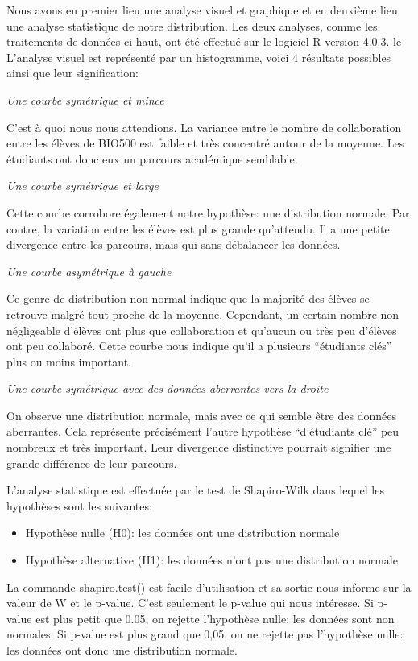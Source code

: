 \documentclass[9pt,twocolumn,twoside,]{pnas-new}
\providecommand{\tightlist}{%
  \setlength{\itemsep}{0pt}\setlength{\parskip}{0pt}}
\begin{document}
Nous avons en premier lieu une analyse visuel et graphique et en
deuxième lieu une analyse statistique de notre distribution. Les deux
analyses, comme les traitements de données ci-haut, ont été effectué sur
le logiciel R version 4.0.3. le L'analyse visuel est représenté par un
histogramme, voici 4 résultats possibles ainsi que leur signification:

\emph{Une courbe symétrique et mince}

C'est à quoi nous nous attendions. La variance entre le nombre de
collaboration entre les élèves de BIO500 est faible et très concentré
autour de la moyenne. Les étudiants ont donc eux un parcours académique
semblable.

\emph{Une courbe symétrique et large}

Cette courbe corrobore également notre hypothèse: une distribution
normale. Par contre, la variation entre les élèves est plus grande
qu'attendu. Il a une petite divergence entre les parcours, mais qui sans
débalancer les données.

\emph{Une courbe asymétrique à gauche}

Ce genre de distribution non normal indique que la majorité des élèves
se retrouve malgré tout proche de la moyenne. Cependant, un certain
nombre non négligeable d'élèves ont plus que collaboration et qu'aucun
ou très peu d'élèves ont peu collaboré. Cette courbe nous indique qu'il
a plusieurs ``étudiants clés'' plus ou moins important.

\emph{Une courbe symétrique avec des données aberrantes vers la droite}

On observe une distribution normale, mais avec ce qui semble être des
données aberrantes. Cela représente précisément l'autre hypothèse
``d'étudiants clé'' peu nombreux et très important. Leur divergence
distinctive pourrait signifier une grande différence de leur parcours.

L'analyse statistique est effectuée par le test de Shapiro-Wilk dans
lequel les hypothèses sont les suivantes:

\begin{itemize}
\tightlist
\item
  Hypothèse nulle (H0): les données ont une distribution normale
\item
  Hypothèse alternative (H1): les données n'ont pas une distribution
  normale
\end{itemize}

La commande shapiro.test() est facile d'utilisation et sa sortie nous
informe sur la valeur de W et le p-value. C'est seulement le p-value qui
nous intéresse. Si p-value est plus petit que 0.05, on rejette
l'hypothèse nulle: les données sont non normales. Si p-value est plus
grand que 0,05, on ne rejette pas l'hypothèse nulle: les données ont
donc une distribution normale.



% 
\end{document}
